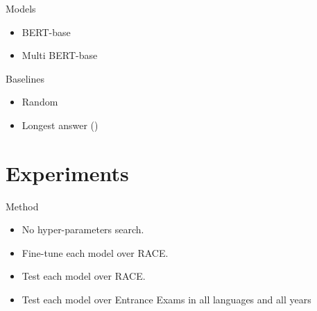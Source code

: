 \documentclass[]{beamer}
\def\mAlertSpace{\vspace{0.5em}}
\begin{document}
  \begin{frame}{\secname}
    \begin{alertblock}{Models}
      \mAlertSpace
      \begin{itemize}
        \item BERT-base
        \item Multi BERT-base
      \end{itemize}
    \end{alertblock}
    \begin{alertblock}{Baselines}
      \mAlertSpace
      \begin{itemize}
        \item Random
        \item Longest answer (\cite{Rogers2020quail})
      \end{itemize}
    \end{alertblock}
  \end{frame}

\section{Experiments}
  \begin{frame}{\secname}
    \begin{alertblock}{Method}
      \begin{itemize}
        \item No hyper-parameters search.
        \item Fine-tune each model over RACE.
        \item Test each model over RACE.
        \item Test each model over Entrance Exams in all languages and all years
      \end{itemize}
    \end{alertblock}
  \end{frame}
\end{document}

